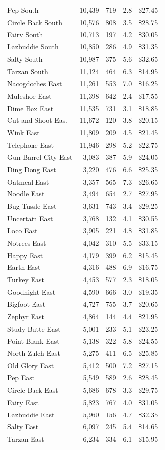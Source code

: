 \documentclass[11pt]{article}
\begin{document}
{\begin{longtable}{@{}lrrrr@{}}
Pep South & 10,439 & 719 & 2.8 & \$27.45 \\
Circle Back South & 10,576 & 808 & 3.5 & \$28.75 \\
Fairy South & 10,713 & 197 & 4.2 & \$30.05 \\
Lazbuddie South & 10,850 & 286 & 4.9 & \$31.35 \\
Salty South & 10,987 & 375 & 5.6 & \$32.65 \\
Tarzan South & 11,124 & 464 & 6.3 & \$14.95 \\
Nacogdoches East & 11,261 & 553 & 7.0 & \$16.25 \\
Muleshoe East & 11,398 & 642 & 2.4 & \$17.55 \\
Dime Box East & 11,535 & 731 & 3.1 & \$18.85 \\
Cut and Shoot East & 11,672 & 120 & 3.8 & \$20.15 \\
Wink East & 11,809 & 209 & 4.5 & \$21.45 \\
Telephone East & 11,946 & 298 & 5.2 & \$22.75 \\
Gun Barrel City East & 3,083 & 387 & 5.9 & \$24.05 \\
Ding Dong East & 3,220 & 476 & 6.6 & \$25.35 \\
Oatmeal East & 3,357 & 565 & 7.3 & \$26.65 \\
Noodle East & 3,494 & 654 & 2.7 & \$27.95 \\
Bug Tussle East & 3,631 & 743 & 3.4 & \$29.25 \\
Uncertain East & 3,768 & 132 & 4.1 & \$30.55 \\
Loco East & 3,905 & 221 & 4.8 & \$31.85 \\
Notrees East & 4,042 & 310 & 5.5 & \$33.15 \\
Happy East & 4,179 & 399 & 6.2 & \$15.45 \\
Earth East & 4,316 & 488 & 6.9 & \$16.75 \\
Turkey East & 4,453 & 577 & 2.3 & \$18.05 \\
Goodnight East & 4,590 & 666 & 3.0 & \$19.35 \\
Bigfoot East & 4,727 & 755 & 3.7 & \$20.65 \\
Zephyr East & 4,864 & 144 & 4.4 & \$21.95 \\
Study Butte East & 5,001 & 233 & 5.1 & \$23.25 \\
Point Blank East & 5,138 & 322 & 5.8 & \$24.55 \\
North Zulch East & 5,275 & 411 & 6.5 & \$25.85 \\
Old Glory East & 5,412 & 500 & 7.2 & \$27.15 \\
Pep East & 5,549 & 589 & 2.6 & \$28.45 \\
Circle Back East & 5,686 & 678 & 3.3 & \$29.75 \\
Fairy East & 5,823 & 767 & 4.0 & \$31.05 \\
Lazbuddie East & 5,960 & 156 & 4.7 & \$32.35 \\
Salty East & 6,097 & 245 & 5.4 & \$14.65 \\
Tarzan East & 6,234 & 334 & 6.1 & \$15.95 \\
\end{longtable}
}
\end{document}
